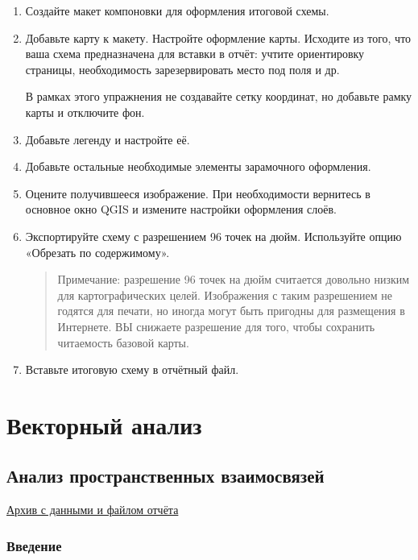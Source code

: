 \documentclass[
  12pt,
]{book}
\begin{document}
\begin{enumerate}
\def\labelenumi{\arabic{enumi}.}
\item
  Создайте макет компоновки для оформления итоговой схемы.
\item
  Добавьте карту к макету. Настройте оформление карты. Исходите из того, что ваша схема предназначена для вставки в отчёт: учтите ориентировку страницы, необходимость зарезервировать место под поля и др.

  В рамках этого упражнения не создавайте сетку координат, но добавьте рамку карты и отключите фон.
\item
  Добавьте легенду и настройте её.
\item
  Добавьте остальные необходимые элементы зарамочного оформления.
\item
  Оцените получившееся изображение. При необходимости вернитесь в основное окно QGIS и измените настройки оформления слоёв.
\item
  Экспортируйте схему с разрешением 96 точек на дюйм. Используйте опцию «Обрезать по содержимому».

  \begin{quote}
  Примечание: разрешение 96 точек на дюйм считается довольно низким для картографических целей. Изображения с таким разрешением не годятся для печати, но иногда могут быть пригодны для размещения в Интернете. ВЫ снижаете разрешение для того, чтобы сохранить читаемость базовой карты.
  \end{quote}
\item
  Вставьте итоговую схему в отчётный файл.
\end{enumerate}

\hypertarget{part-ux432ux435ux43aux442ux43eux440ux43dux44bux439-ux430ux43dux430ux43bux438ux437}{%
\part{Векторный анализ}\label{part-ux432ux435ux43aux442ux43eux440ux43dux44bux439-ux430ux43dux430ux43bux438ux437}}

\hypertarget{overlay}{%
\chapter{Анализ пространственных взаимосвязей}\label{overlay}}

\href{https://1drv.ms/u/s!AmtmZDq3JgxHgZwTRaz2TTFXB0zi1A?e=2zaqzG}{Архив с данными и файлом отчёта}

\hypertarget{overlay-intro}{%
\section{Введение}\label{overlay-intro}}
\end{document}
